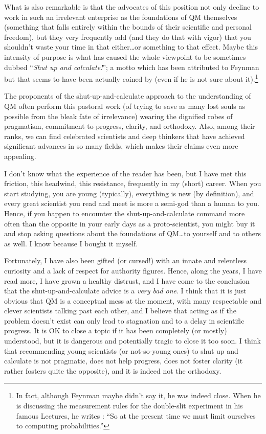 \documentclass[a4paper,12pt]{article}
\begin{document}
What is also remarkable is that the advocates of this position not only
decline to work in such an irrelevant enterprise as the foundations of QM
themselves (something that falls entirely within the bounds of their
scientific and personal freedom), but they very frequently add (and they do
that with vigor) that you shouldn't waste your time in that either\ldots or
something to that effect. Maybe this intensity of purpose is what has caused
the whole viewpoint to be sometimes dubbed ``\emph{Shut up and calculate!}'';
a motto which has been attributed to Feynman but that seems to have been
actually coined by \cite{Mermin2004} (even if he is not sure about
it).\footnote{\label{foot:Feynman_compute} In fact, although Feynman maybe
didn't say it, he was indeed close. When he is discussing the measurement
rules for the double-slit experiment in his famous Lectures, he writes
\citep[p.~10-1]{Feynman1963}: ``So at the present time we must limit ourselves
to computing probabilities.''}

The proponents of the shut-up-and-calculate approach to the understanding of
QM often perform this pastoral work (of trying to save as many lost souls as
possible from the bleak fate of irrelevance) wearing the dignified robes of
pragmatism, commitment to progress, clarity, and orthodoxy. Also, among their
ranks, we can find celebrated scientists and deep thinkers that have achieved
significant advances in so many fields, which makes their claims even more
appealing.

I don't know what the experience of the reader has been, but I have met this
friction, this headwind, this resistance, frequently in my (short) career.
When you start studying, you are young (typically), everything is new (by
definition), and every great scientist you read and meet is more a semi-god
than a human to you. Hence, if you happen to encounter the
shut-up-and-calculate command more often than the opposite in your early days
as a proto-scientist, you might buy it and stop asking questions about the
foundations of QM\ldots to yourself and to others as well. I know because I
bought it myself.

Fortunately, I have also been gifted (or cursed!) with an innate and
relentless curiosity and a lack of respect for authority figures. Hence, along
the years, I have read more, I have grown a healthy distrust, and I have come
to the conclusion that the shut-up-and-calculate advice is a \emph{very bad
one}. I think that it is just obvious that QM is a conceptual mess at the
moment, with many respectable and clever scientists talking past each other,
and I believe that acting as if the problem doesn't exist can only lead to
stagnation and to a delay in scientific progress. It is OK to close a topic if
it has been completely (or mostly) understood, but it is dangerous and
potentially tragic to close it too soon. I think that recommending young
scientists (or not-so-young ones) to shut up and calculate is not pragmatic,
does not help progress, does not foster clarity (it rather fosters quite the
opposite), and it is indeed not the orthodoxy.
\end{document}
